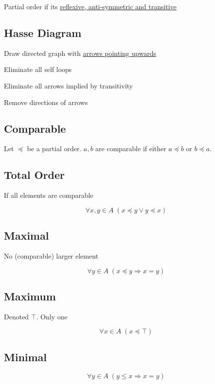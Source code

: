 \documentclass[12pt]{article}
\begin{document}
\begin{spacing}{1.5}
Partial order if its \underline{reflexive, anti-symmetric and transitive}

\subsection{Hasse Diagram}

\begin{enumerate*}
	\item Draw directed graph with \underline{arrows pointing upwards}
	\item Eliminate all self loops 
	\item Eliminate all arrows implied by transitivity
	\item Remove directions of arrows
\end{enumerate*}

\subsection{Comparable}

Let $\preceq$ be a partial order. $a, b$ are comparable if either $a \preceq b$ or $b \preceq a$. 

\subsection{Total Order} 

If all elements are comparable

$$\forall x, y \in A \; (x \preceq y \vee y \preceq x)$$

\subsection{Maximal}

No (comparable) larger element

$$\forall y \in A \; (x \preceq y \Rightarrow x = y)$$

\subsection{Maximum}

Denoted $\top$. Only one

$$\forall x \in A \; (x \preceq \top)$$

\subsection{Minimal}

$$\forall y \in A \; (y \le x \Rightarrow x = y)$$


\end{spacing}
\end{document}
